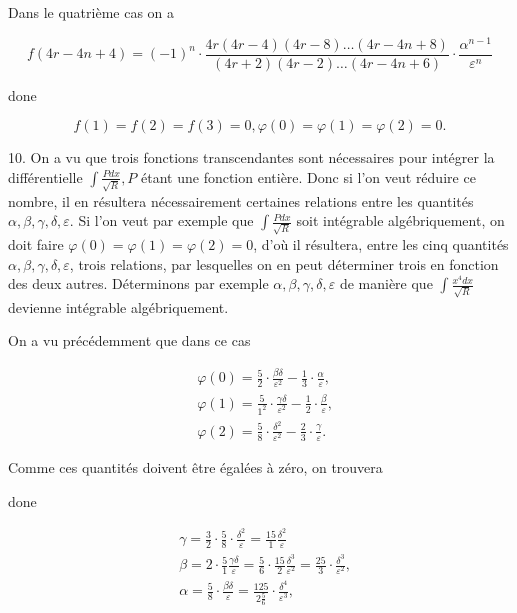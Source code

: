 \documentclass{article}
\begin{document}
Dans le quatrième cas on a

\[
f(4 r-4 n+4)=(-1)^{n} \cdot \frac{4 r(4 r-4)(4 r-8) \ldots(4 r-4 n+8)}{(4 r+2)(4 r-2) \ldots(4 r-4 n+6)} \cdot \frac{\alpha^{n-1}}{\varepsilon^{n}}
\]

done

\[
f(1)=f(2)=f(3)=0, \varphi(0)=\varphi(1)=\varphi(2)=0 .
\]

10. On a vu que trois fonctions transcendantes sont nécessaires pour intégrer la différentielle \(\int \frac{P d x}{\sqrt{R}}, P\) étant une fonction entière. Donc si l'on veut réduire ce nombre, il en résultera nécessairement certaines relations entre les quantités \(\alpha, \beta, \gamma, \delta, \varepsilon\). Si l'on veut par exemple que \(\int \frac{P d x}{\sqrt{R}}\) soit intégrable algébriquement, on doit faire \(\varphi(0)=\varphi(1)=\varphi(2)=0\), d'où il résultera, entre les cinq quantités \(\alpha, \beta, \gamma, \delta, \varepsilon\), trois relations, par lesquelles on en peut déterminer trois en fonction des deux autres. Déterminons par exemple \(\alpha, \beta, \gamma, \delta, \varepsilon\) de manière que \(\int \frac{x^{4} d x}{\sqrt{R}}\) devienne intégrable algébriquement.

On a vu précédemment que dans ce cas

\[
\begin{aligned}
& \varphi(0)=\frac{5}{2} \cdot \frac{\beta \delta}{\varepsilon^{2}}-\frac{1}{3} \cdot \frac{\alpha}{\varepsilon}, \\
& \varphi(1)=\frac{5}{1^{2}} \cdot \frac{\gamma \delta}{\varepsilon^{2}}-\frac{1}{2} \cdot \frac{\beta}{\varepsilon}, \\
& \varphi(2)=\frac{5}{8} \cdot \frac{\delta^{2}}{\varepsilon^{2}}-\frac{2}{3} \cdot \frac{\gamma}{\varepsilon} .
\end{aligned}
\]

Comme ces quantités doivent être égalées à zéro, on trouvera

done

\[
\begin{aligned}
& \gamma=\frac{3}{2} \cdot \frac{5}{8} \cdot \frac{\delta^{2}}{\varepsilon}=\frac{15}{1} \frac{\delta^{2}}{\varepsilon} \\
& \beta=2 \cdot \frac{5}{1} \frac{\gamma \delta}{\varepsilon}=\frac{5}{6} \cdot \frac{15}{2} \frac{\delta^{3}}{\varepsilon^{2}}=\frac{25}{3} \cdot \frac{\delta^{3}}{\varepsilon^{2}}, \\
& \alpha=\frac{5}{8} \cdot \frac{\beta \delta}{\varepsilon}=\frac{125}{2 \frac{5}{6}} \cdot \frac{\delta^{4}}{\varepsilon^{3}},
\end{aligned}
\]
\end{document}
